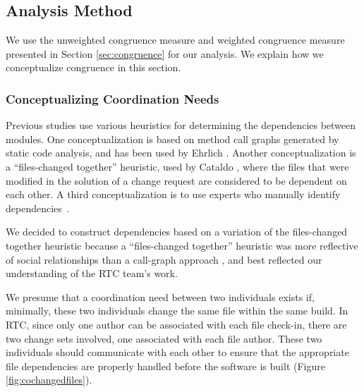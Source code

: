 %

\subsection{Analysis Method}
\label{sec:analysis}

We use the unweighted congruence measure and weighted congruence measure presented in Section \ref{sec:congruence} for our analysis. We explain how we conceptualize congruence in this section.

\subsubsection{Conceptualizing Coordination Needs}


Previous studies use various heuristics for determining the dependencies between modules. One conceptualization is based on method call graphs generated by static code analysis, and has been used by Ehrlich \cite{ehrlich2008:gaps}.  Another conceptualization is a ``files-changed together'' heuristic, used by Cataldo \cite{cataldo:cscw:2006}, where the files that were modified in the solution of a change request are considered to be dependent on each other. A third conceptualization is to use experts who manually identify dependencies~\cite{gokpinar2010}.

We decided to construct dependencies based on a variation of the files-changed together heuristic because a ``files-changed together'' heuristic was more reflective of social relationships than a call-graph approach \cite{cataldo:esem:2008}, and best reflected our understanding of the RTC team's work.

We presume that a coordination need between two individuals exists if, minimally, these two individuals change the same file within the same build. In RTC, since only one author can be associated with each file check-in, there are two change sets involved, one associated with each file author. These two individuals should communicate with each other to ensure that the appropriate file dependencies are properly handled before the software is built (Figure \ref{fig:cochangedfiles}).

